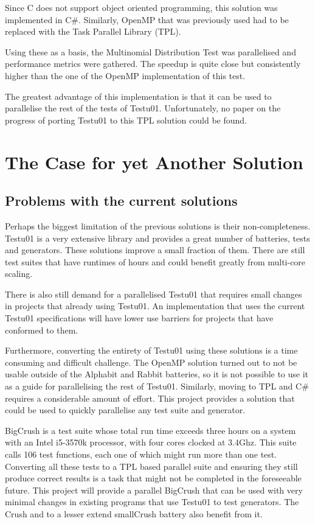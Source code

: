 Since C does not support object oriented programming, this solution was implemented in C\#. Similarly, OpenMP that was previously used had to be replaced with the Task Parallel Library (TPL).

Using these as a basis, the Multinomial Distribution Test was parallelised and performance metrics were gathered. The speedup is quite close but consistently higher than the one of the OpenMP implementation of this test.

The greatest advantage of this implementation is that it can be used to parallelise the rest of the tests of Testu01. Unfortunately, no paper on the progress of porting Testu01 to this TPL solution could be found.

\section{The Case for yet Another Solution}
\subsection{Problems with the current solutions}
Perhaps the biggest limitation of the previous solutions is their non-completeness. Testu01 is a very extensive library and provides a great number of batteries, tests and generators. These solutions improve a small fraction of them. There are still test suites that have runtimes of hours and could benefit greatly from multi-core scaling.

There is also still demand for a parallelised Testu01 that requires small changes in projects that already using Testu01. An implementation that uses the current  Testu01 specifications will have lower use barriers for projects that have conformed to them.

Furthermore, converting the entirety of Testu01 using these solutions is a time consuming and difficult challenge. The OpenMP solution turned out to not be usable outside of the Alphabit and Rabbit batteries, so it is not possible to use it as a guide for parallelising the rest of Testu01. Similarly, moving to TPL and C\# requires a considerable amount of effort. This project provides a solution that could be used to quickly parallelise any test suite and generator.

BigCrush is a test suite whose total run time exceeds three hours on a system with an Intel i5-3570k processor, with four cores clocked at 3.4Ghz. This suite calls 106 test functions, each one of which might run more than one test. Converting all these tests to a TPL based parallel suite and ensuring they still produce correct results is a task that might not be completed in the foreseeable future. This project will provide a parallel BigCrush that can be used with very minimal changes in existing programs that use Testu01 to test generators. The Crush and to a lesser extend smallCrush battery also benefit from it.
